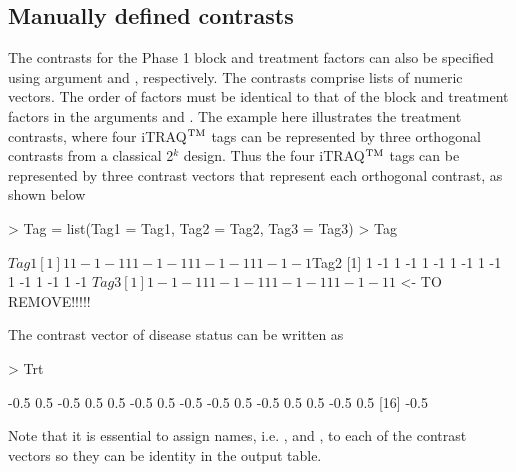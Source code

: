 \documentclass[article]{jss}
\begin{document}
\subsection{Manually defined contrasts}
The contrasts for the Phase 1 block and treatment factors can also be specified using argument  and , respectively. The contrasts comprise lists of numeric vectors. The order of factors must be identical to that of the block and treatment factors in the arguments  and . The example here illustrates the treatment contrasts, where four iTRAQ$^{\rm TM}$ tags can be represented by three orthogonal contrasts from a classical 2$^k$ design. Thus the four iTRAQ$^{\rm TM}$ tags can be represented by three contrast vectors that represent each orthogonal contrast, as shown below
\begin{CodeChunk}
\begin{CodeInput}
> Tag = list(Tag1 = Tag1, Tag2 = Tag2, Tag3 = Tag3)
> Tag
\end{CodeInput}
\begin{CodeOutput}
$Tag1
 [1]  1  1 -1 -1  1  1 -1 -1  1  1 -1 -1  1  1 -1 -1
$Tag2
 [1]  1 -1  1 -1  1 -1  1 -1  1 -1  1 -1  1 -1  1 -1
$Tag3
 [1]  1 -1 -1  1  1 -1 -1  1  1 -1 -1  1  1 -1 -1  1
$ <- TO REMOVE!!!!!
\end{CodeOutput}
\end{CodeChunk}
 The contrast vector of disease status can be written as
\begin{CodeChunk}
\begin{CodeInput}
> Trt
\end{CodeInput}
\begin{CodeOutput}
 [1] -0.5  0.5 -0.5  0.5  0.5 -0.5  0.5 -0.5 -0.5  0.5 -0.5  0.5  0.5 -0.5  0.5
[16] -0.5
\end{CodeOutput}
\end{CodeChunk}
Note that it is essential to assign names, i.e. ,  and , to each of the contrast vectors so they can be identity in the output table.
\end{document}
